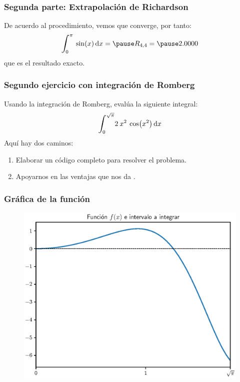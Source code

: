 \documentclass[12pt]{beamer}
\begin{document}
\begin{frame}
\frametitle{Segunda parte: Extrapolación de Richardson}
De acuerdo al procedimiento, vemos que converge, por tanto:
\pause
\begin{eqnarray*}
\scaleint{6ex}_{\bs 0}^{\pi} \: \sin (x) \dd{x} = \pause R_{4, 4} = \pause 2.0000
\end{eqnarray*}
que es el resultado exacto.
\end{frame}
\begin{frame}
\frametitle{Segundo ejercicio con integración de Romberg}
Usando la integración de Romberg, evalúa la siguiente integral:
\begin{align*}
\scaleint{6ex}_{\bs 0}^{\sqrt{\pi}} 2 \: x^{2} \:  \cos(x^{2}) \dd{x}
\end{align*}
\pause
Aquí hay dos caminos:
\pause
{}
\begin{enumerate}[<+->]
\item Elaborar un código completo para resolver el problema.
\item Apoyarnos en las ventajas que nos da \python.
\end{enumerate}
\end{frame}
\begin{frame}
\frametitle{Gráfica de la función}
\begin{figure}
    \centering
    \includegraphics[scale=0.55]{Imagenes/integracion_ejercicio_Romberg_01.eps}
\end{figure}
\end{frame}
\end{document}
